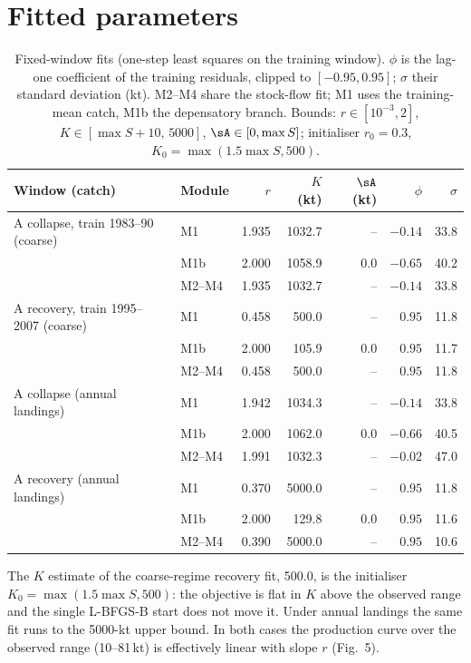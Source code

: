 \FloatBarrier
\section{Fitted parameters}\label{si:params}

\begin{table}[!htb]
\centering\small
\caption{Fixed-window fits (one-step least squares on the training window). $\phi$ is the lag-one coefficient of the training residuals, clipped to $[-0.95,0.95]$; $\sigma$ their standard deviation (kt). M2--M4 share the stock-flow fit; M1 uses the training-mean catch, M1b the depensatory branch. Bounds: $r\in[10^{-3},2]$, $K\in[\max S+10,\,5000]$, $\sA\in[0,\max S]$; initialiser $r_0=0.3$, $K_0=\max(1.5\max S, 500)$.}
\label{tab:si_fixedfits}
\begin{tabular}{@{}llrrrrr@{}}
\toprule
Window (catch) & Module & $r$ & $K$ (kt) & $\sA$ (kt) & $\phi$ & $\sigma$ \\
\midrule
A collapse, train 1983--90 (coarse) & M1 & 1.935 & 1032.7 & -- & $-0.14$ & 33.8 \\
 & M1b & 2.000 & 1058.9 & 0.0 & $-0.65$ & 40.2 \\
 & M2--M4 & 1.935 & 1032.7 & -- & $-0.14$ & 33.8 \\
A recovery, train 1995--2007 (coarse) & M1 & 0.458 & 500.0 & -- & $0.95$ & 11.8 \\
 & M1b & 2.000 & 105.9 & 0.0 & $0.95$ & 11.7 \\
 & M2--M4 & 0.458 & 500.0 & -- & $0.95$ & 11.8 \\
A collapse (annual landings) & M1 & 1.942 & 1034.3 & -- & $-0.14$ & 33.8 \\
 & M1b & 2.000 & 1062.0 & 0.0 & $-0.66$ & 40.5 \\
 & M2--M4 & 1.991 & 1032.3 & -- & $-0.02$ & 47.0 \\
A recovery (annual landings) & M1 & 0.370 & 5000.0 & -- & $0.95$ & 11.8 \\
 & M1b & 2.000 & 129.8 & 0.0 & $0.95$ & 11.6 \\
 & M2--M4 & 0.390 & 5000.0 & -- & $0.95$ & 10.6 \\
\bottomrule
\end{tabular}
\end{table}

The $K$ estimate of the coarse-regime recovery fit, 500.0, is the initialiser $K_0 = \max(1.5\max S, 500)$: the objective is flat in $K$ above the observed range and the single L-BFGS-B start does not move it. Under annual landings the same fit runs to the 5000-kt upper bound. In both cases the production curve over the observed range (10--81\,kt) is effectively linear with slope $r$ (Fig.~5).

